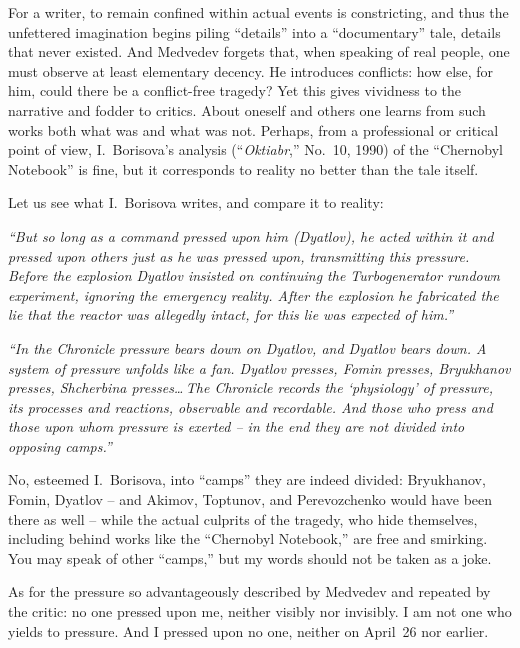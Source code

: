 \documentclass[openright]{bookest}
\begin{document}

For a writer, to remain confined within actual events is constricting, and thus the unfettered imagination begins piling ``details'' into a ``documentary'' tale, details that never existed. And Medvedev forgets that, when speaking of real people, one must observe at least elementary decency. He introduces conflicts: how else, for him, could there be a conflict-free tragedy? Yet this gives vividness to the narrative and fodder to critics. About oneself and others one learns from such works both what was and what was not. Perhaps, from a professional or critical point of view, I.~Borisova's analysis (``\textit{Oktiabr},'' No.~10, 1990) of the ``Chernobyl Notebook'' is fine, but it corresponds to reality no better than the tale itself.

Let us see what I.~Borisova writes, and compare it to reality:
\begin{personal}
\textit{``But so long as a command pressed upon him (Dyatlov), he acted within it and pressed upon others just as he was pressed upon, transmitting this pressure. Before the explosion Dyatlov insisted on continuing the Turbogenerator rundown experiment, ignoring the emergency reality. After the explosion he fabricated the lie that the reactor was allegedly intact, for this lie was expected of him.''}

\textit{``In the Chronicle pressure bears down on Dyatlov, and Dyatlov bears down. A system of pressure unfolds like a fan. Dyatlov presses, Fomin presses, Bryukhanov presses, Shcherbina presses\ldots\,The Chronicle records the `physiology' of pressure, its processes and reactions, observable and recordable. And those who press and those upon whom pressure is exerted -- in the end they are not divided into opposing camps.''}
\end{personal}

No, esteemed I.~Borisova, into ``camps'' they are indeed divided: Bryukhanov, Fomin, Dyatlov -- and Akimov, Toptunov, and Perevozchenko would have been there as well -- while the actual culprits of the tragedy, who hide themselves, including behind works like the ``Chernobyl Notebook,'' are free and smirking. You may speak of other ``camps,'' but my words should not be taken as a joke.

As for the pressure so advantageously described by Medvedev and repeated by the critic: no one pressed upon me, neither visibly nor invisibly. I am not one who yields to pressure. And I pressed upon no one, neither on April~26 nor earlier.
\end{document}
